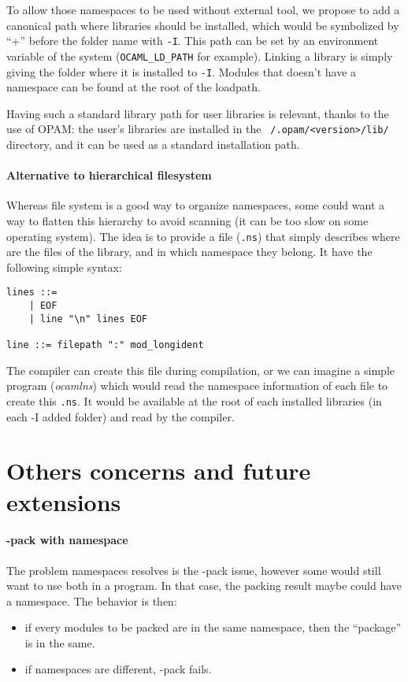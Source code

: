 \documentclass[11pt,a4paper]{article}
\begin{document}
To allow those namespaces to be used without external tool, we propose to add a
canonical path where libraries should be installed, which would be symbolized by
``+'' before the folder name with \texttt{-I}. This path can be set by an
environment variable of the system (\texttt{OCAML\_LD\_PATH} for
example). Linking a library is simply giving the folder where it is installed to
\texttt{-I}. Modules that doesn't have a namespace can be found at the root of
the loadpath.

Having such a standard library path for user libraries is relevant, thanks to
the use of OPAM: the user's libraries are installed in the
\texttt{~/.opam/<version>/lib/} directory, and it can be used as a standard
installation path. 

\paragraph{Alternative to hierarchical filesystem}

Whereas file system is a good way to organize namespaces, some could want a way
to flatten this hierarchy to avoid scanning (it can be too slow on some
operating system). The idea is to provide a file (\texttt{.ns}) that simply
describes where are the files of the library, and in which namespace they
belong. It have the following simple syntax:

\begin{verbatim}
lines ::=
    | EOF
    | line "\n" lines EOF

line ::= filepath ":" mod_longident
\end{verbatim}

The compiler can create this file during compilation, or we can imagine a simple
program (\emph{ocamlns}) which would read the namespace information of each file
to create this \texttt{.ns}. It would be available at the root of each installed
libraries (in each -I added folder) and read by the compiler.


\section{Others concerns and future extensions}

\paragraph{-pack with namespace}

The problem namespaces resolves is the -pack issue, however some would still
want to use both in a program. In that case, the packing result maybe could have
a namespace. The behavior is then:
\begin{itemize}
\item if every modules to be packed are in the same namespace, then the
  ``package'' is in the same.
\item if namespaces are different, -pack fails.
\end{itemize}
\end{document}
